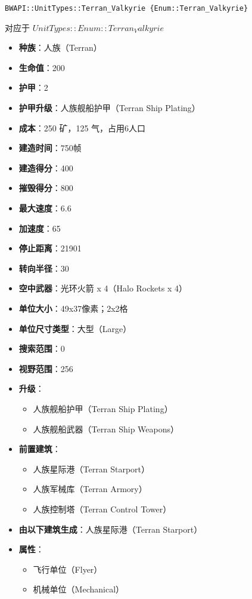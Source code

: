 \begin{tcolorbox}[colback=white, colframe=black!60!white, title=Terran\_Valkyrie(), arc=0mm]
    \begin{verbatim}
BWAPI::UnitTypes::Terran_Valkyrie {Enum::Terran_Valkyrie}
    \end{verbatim}
    对应于  $ UnitTypes::Enum::Terran_Valkyrie $ 
    \begin{itemize}
        \item \textbf{种族}：人族（Terran）
        \item \textbf{生命值}：200
        \item \textbf{护甲}：2
        \item \textbf{护甲升级}：人族舰船护甲（Terran Ship Plating）
        \item \textbf{成本}：250 矿，125 气，占用6人口
        \item \textbf{建造时间}：750帧
        \item \textbf{建造得分}：400
        \item \textbf{摧毁得分}：800
        \item \textbf{最大速度}：6.6
        \item \textbf{加速度}：65
        \item \textbf{停止距离}：21901
        \item \textbf{转向半径}：30
        \item \textbf{空中武器}：光环火箭 x 4（Halo Rockets x 4）
        \item \textbf{单位大小}：49x37像素；2x2格
        \item \textbf{单位尺寸类型}：大型（Large）
        \item \textbf{搜索范围}：0
        \item \textbf{视野范围}：256
        \item \textbf{升级}：
            \begin{itemize}
                \item 人族舰船护甲（Terran Ship Plating）
                \item 人族舰船武器（Terran Ship Weapons）
            \end{itemize}
        \item \textbf{前置建筑}：
            \begin{itemize}
                \item 人族星际港（Terran Starport）
                \item 人族军械库（Terran Armory）
                \item 人族控制塔（Terran Control Tower）
            \end{itemize}
        \item \textbf{由以下建筑生成}：人族星际港（Terran Starport）
        \item \textbf{属性}：
            \begin{itemize}
                \item 飞行单位（Flyer）
                \item 机械单位（Mechanical）
            \end{itemize}
    \end{itemize}
\end{tcolorbox}

